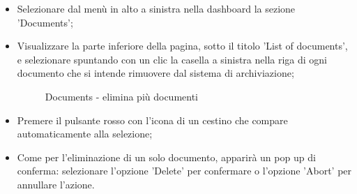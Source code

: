 \documentclass[10pt, a4paper]{article}
\begin{document}
\begin{itemize}
    \item Selezionare dal menù in alto a sinistra nella dashboard la sezione 'Documents';
    \item Visualizzare la parte inferiore della pagina, sotto il titolo 'List of documents', e selezionare spuntando con un clic la casella a sinistra nella riga di ogni documento che si intende rimuovere dal sistema di archiviazione;
    \begin{figure}[H]
        \centering  
        \caption{Documents - elimina più documenti}
        \label{img:delMultDoc}
    \end{figure}
    \item Premere il pulsante rosso con l'icona di un cestino che compare automaticamente alla selezione;
    \item Come per l'eliminazione di un solo documento, apparirà un pop up di conferma: selezionare l'opzione 'Delete' per confermare o l'opzione 'Abort' per annullare l'azione.
\end{itemize}
\end{document}
